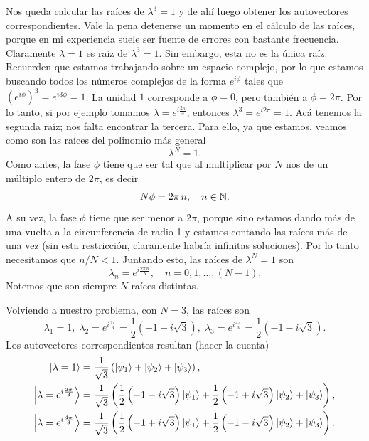 \documentclass[10pt, a4paper]{article}
\numberwithin{equation}{subsection}
\begin{document}
Nos queda calcular las raíces de $\lambda^3 = 1$ y de ahí luego obtener los
autovectores correspondientes. Vale la pena detenerse un momento en el
cálculo de las raíces, porque en mi experiencia suele ser fuente de errores
con bastante frecuencia. Claramente $\lambda = 1$ es raíz de $\lambda^3 = 1$.
Sin embargo, esta no es la única raíz. Recuerden que estamos trabajando sobre
un espacio complejo, por lo que estamos buscando todos los números complejos de
la forma $e^{i\phi}$ tales que $\left(e^{i\phi}\right)^3 = e^{i3\phi} = 1$. La
unidad $1$ corresponde a $\phi = 0$, pero también a $\phi = 2\pi$. Por lo
tanto, si por ejemplo tomamos $\lambda = e^{i\frac{2\pi}{3}}$, entonces
$\lambda^3 = e^{i2\pi} = 1$. Acá tenemos la segunda raíz; nos falta encontrar
la tercera. Para ello, ya que estamos, veamos como son las raíces del polinomio
más general
\begin{equation}
  \lambda^N = 1.
\end{equation}
Como antes, la fase $\phi$ tiene que ser tal que al multiplicar por $N$ nos de
un múltiplo entero de $2\pi$, es decir
\begin{equation}
  N\phi = 2\pi\,n, \quad n\in\mathbb{N}.
\end{equation}
A su vez, la fase $\phi$ tiene que ser menor a $2\pi$, porque sino estamos
dando más de una vuelta a la circunferencia de radio 1 y estamos contando las
raíces más de una vez (sin esta restricción, claramente habría infinitas
soluciones). Por lo tanto necesitamos que $n/N < 1$. Juntando esto, las raíces
de $\lambda^N = 1$ son
\begin{equation}
  \lambda_n = e^{i\frac{2\pi\,n}{N}}, \quad n = 0, 1, \dots, (N - 1).
\end{equation}
Notemos que son siempre $N$ raíces distintas.

Volviendo a nuestro problema, con $N = 3$, las raíces son
\begin{equation} \label{eq:triatom_roots}
  \lambda_1 = 1, \;
  \lambda_2 = e^{i\frac{2\pi}{3}} = \frac{1}{2}\left(-1 + i\sqrt{3}\right), \;
  \lambda_3 = e^{i\frac{4\pi}{3}} = \frac{1}{2}\left(-1 - i\sqrt{3}\right).
\end{equation}
Los autovectores correspondientes resultan (hacer la cuenta)
\begin{align}
  \ket{\lambda = 1} &= \frac{1}{\sqrt{3}}\left(\ket{\psi_1} + \ket{\psi_2} +
    \ket{\psi_3}\right), \\
  \ket{\lambda = e^{i\frac{2\pi}{3}}} &= \frac{1}{\sqrt{3}}\left(
    \frac{1}{2}\left(-1 - i\sqrt{3}\right)\ket{\psi_1} + 
    \frac{1}{2}\left(-1 + i\sqrt{3}\right)\ket{\psi_2} + \ket{\psi_3}\right),
    \\
  \ket{\lambda = e^{i\frac{4\pi}{3}}} &= \frac{1}{\sqrt{3}}\left(
    \frac{1}{2}\left(-1 + i\sqrt{3}\right)\ket{\psi_1} + 
    \frac{1}{2}\left(-1 - i\sqrt{3}\right)\ket{\psi_2} + \ket{\psi_3}\right).
\end{align}
\end{document}
